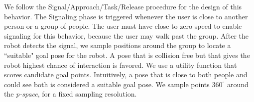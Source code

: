 We follow the Signal/Approach/Task/Release procedure for the design of this behavior. The Signaling phase is triggered whenever the user is close to another person or a group of people. The user must have close to zero speed to enable signaling for this behavior, because the user may walk past the group. After the robot detects the signal, we sample positions around the group to locate a ``suitable" goal pose for the robot. A pose that is collision free but that gives the robot highest chance of interaction is favored. We use a utility function that scores candidate goal points. Intuitively, a pose that is close to both people and could see both is considered a suitable goal pose. We sample points $360^{\circ}$ around the \textit{p-space}, for a fixed sampling resolution. 

\begin{figure}[ht!]
\centering
%
          \\
\end{figure}
